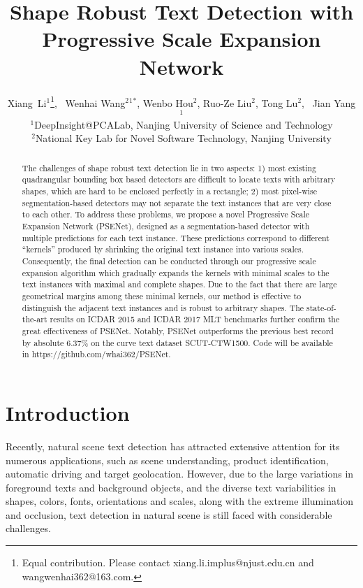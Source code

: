 \documentclass{article}
\title{Shape Robust Text Detection with Progressive Scale Expansion Network}
\author{
   Xiang~Li$^1$\thanks{Equal contribution. Please contact xiang.li.implus@njust.edu.cn and wangwenhai362@163.com.}, ~Wenhai Wang$^2$$^1$$^*$, Wenbo Hou$^2$, Ruo-Ze Liu$^2$, Tong Lu$^2$, ~Jian Yang$^1$\\
   $^1$DeepInsight@PCALab, Nanjing University of Science and Technology\\
   $^2$National Key Lab for Novel Software Technology, Nanjing University\\
}
\begin{document}
\maketitle

\begin{abstract}
	The challenges of shape robust text detection lie in two aspects: 1) most existing quadrangular bounding box based detectors are difficult to locate texts with arbitrary shapes, which are hard to be enclosed perfectly in a rectangle; 2) most pixel-wise segmentation-based detectors may not separate the text instances that are very close to each other. To address these problems, we propose a novel Progressive Scale Expansion Network (PSENet), designed as a segmentation-based detector with multiple predictions for each text instance. These predictions correspond to different ``kernels'' produced by shrinking the original text instance into various scales. Consequently, the final detection can be conducted through our progressive scale expansion algorithm which gradually expands the kernels with minimal scales to the text instances with maximal and complete shapes. Due to the fact that there are large geometrical margins among these minimal kernels, our method is effective to distinguish the adjacent text instances and is robust to arbitrary shapes. The state-of-the-art results on ICDAR 2015 and ICDAR 2017 MLT benchmarks further confirm the great effectiveness of PSENet. Notably, PSENet outperforms the previous best record by absolute 6.37\% on the curve text dataset SCUT-CTW1500. Code will be available in https://github.com/whai362/PSENet.
\end{abstract}

\section{Introduction}
Recently, natural scene text detection has attracted extensive attention for its numerous applications, such as scene understanding, product identification, automatic driving and target geolocation. However, due to the large variations in foreground texts and background objects, and the diverse text variabilities in shapes, colors, fonts, orientations and scales, along with the extreme illumination and occlusion, text detection in natural scene is still faced with considerable challenges.
\end{document}
